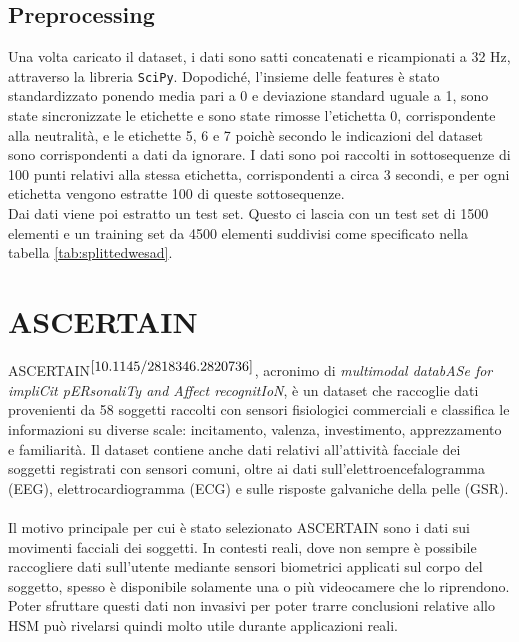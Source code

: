 \subsection{Preprocessing}
Una volta caricato il dataset, i dati sono satti concatenati e ricampionati a 32 Hz, attraverso la libreria \texttt{SciPy}. Dopodiché, l'insieme delle features è stato standardizzato ponendo media pari a 0 e deviazione standard uguale a 1, sono state sincronizzate le etichette e sono state rimosse l'etichetta 0, corrispondente alla neutralità, e le etichette 5, 6 e 7 poichè secondo le indicazioni del dataset sono corrispondenti a dati da ignorare. I dati sono poi raccolti in sottosequenze di 100 punti relativi alla stessa etichetta, corrispondenti a circa 3 secondi, e per ogni etichetta vengono estratte 100 di queste sottosequenze.\\
Dai dati viene poi estratto un test set. Questo ci lascia con un test set di 1500 elementi e un training set da 4500 elementi suddivisi come specificato nella tabella \ref{tab:splittedwesad}.
% 

\section{ASCERTAIN }
ASCERTAIN$^{\cite{10.1145/2818346.2820736}}$, acronimo di \textit{multimodal databASe for impliCit pERsonaliTy and Affect recognitIoN}, è un dataset che raccoglie dati provenienti da 58 soggetti raccolti con sensori fisiologici commerciali e classifica le informazioni su diverse scale: incitamento, valenza, investimento, apprezzamento e familiarità. Il dataset contiene anche dati relativi all'attività facciale dei soggetti registrati con sensori comuni, oltre ai dati sull'elettroencefalogramma (EEG), elettrocardiogramma (ECG) e sulle risposte galvaniche della pelle (GSR).\\\\
Il motivo principale per cui è stato selezionato ASCERTAIN sono i dati sui movimenti facciali dei soggetti. In contesti reali, dove non sempre è possibile raccogliere dati sull'utente mediante sensori biometrici applicati sul corpo del soggetto, spesso è disponibile solamente una o più videocamere che lo riprendono. Poter sfruttare questi dati non invasivi per poter trarre conclusioni relative allo HSM può rivelarsi quindi molto utile durante applicazioni reali.
